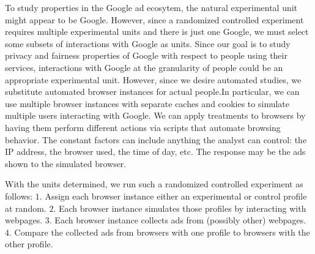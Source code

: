 \documentclass[10pt, onecolumn]{report}
\begin{document}
To study properties in the Google ad ecosytem, the natural experimental unit 
might appear to be Google. %
However, since a randomized controlled experiment requires multiple experimental units and there is just one Google, we must select some subsets of interactions with Google 
as units. Since our goal is to study privacy and fairness properties of Google 
with respect to people using their services, interactions with Google at 
the granularity of people could be an appropriate experimental unit.  
%
However, since we desire automated studies, we substitute  automated browser 
instances for actual people.In particular, we can use multiple browser instances 
with separate caches and cookies to simulate multiple users interacting 
with Google. We can apply treatments to browsers by having them 
perform different actions via scripts that automate browsing behavior.
The constant factors can include anything the analyst can control: the IP 
address, the browser used, the time of day, etc.
The response may be the ads shown to the simulated browser.

With the units determined, we run such a randomized controlled experiment as follows:
$1.$ Assign each browser instance either an experimental or control profile at random.
$2.$ Each browser instance simulates those profiles by interacting with webpages.
$3.$ Each browser instance collects ads from (possibly other) webpages.
$4.$ Compare the collected ads from browsers with one profile to browsers with the other profile.

\end{document}

